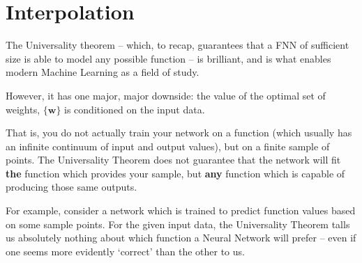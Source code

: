 \documentclass[a4paper,openany,11pt]{book}
\renewcommand\vec[1]{\boldsymbol{\mathbf{#1}}}
\begin{document}
			\section{Interpolation}

				The Universality theorem -- which, to recap, guarantees that a FNN of sufficient size is able to model any possible function -- is brilliant, and is what enables modern Machine Learning as a field of study. 

				However, it has one major, major downside: the value of the optimal set of weights, $\{\vec{w}\}$ is conditioned on the input data. 

				That is, you do not actually train your network on a function (which usually has an infinite continuum of input and output values), but on a finite sample of points. The Universality Theorem does not guarantee that the network will fit \textbf{the} function which provides your sample, but \textbf{any} function which is capable of producing those same outputs. 

				For example, consider a network which is trained to predict function values based on some sample points. For the given input data, the Universality Theorem talls us absolutely nothing about which function a Neural Network will prefer -- even if one seems more evidently `correct' than the other to us. 

				\begin{center}
					\end{center}
\end{document}
